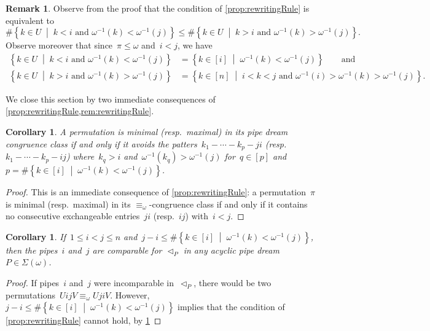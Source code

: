 \documentclass{amsart}
\newtheorem{corollary}[theorem]{Corollary}
\theoremstyle{definition}
\newtheorem{remark}[theorem]{Remark}
\newcommand{\set}[2]{\left\{ #1 \;\middle|\; #2 \right\}} %
\newcommand{\acyclicPipeDreams}{\Sigma} %
\newcommand{\less}{\vartriangleleft} %
\newcommand{\contactLess}[1]{\less_{#1}} %
\begin{document}
\begin{remark}
\label{rem:rewritingRule}
Observe from the proof that the condition of \cref{prop:rewritingRule} is equivalent to
\[
\# \set{k \in U}{k < i \text{ and } \omega^{-1}(k) < \omega^{-1}(j)} \le \# \set{k \in U}{k > i \text{ and } \omega^{-1}(k) > \omega^{-1}(j)}.
\]
Observe moreover that since~$\pi \le \omega$ and~$i < j$, we have
\begin{align*}
\set{k \in U}{k < i \text{ and } \omega^{-1}(k) < \omega^{-1}(j)} & = \set{k \in [i]}{\omega^{-1}(k) < \omega^{-1}(j)} \qquad \text{and}\\
\set{k \in U}{k > i \text{ and } \omega^{-1}(k) > \omega^{-1}(j)} & = \set{k \in [n]}{i < k < j \text{ and } \omega^{-1}(i) > \omega^{-1}(k) > \omega^{-1}(j)}.
\end{align*}
\end{remark}

We close this section by two immediate consequences of \cref{prop:rewritingRule,rem:rewritingRule}.

\begin{corollary}
\label{coro:patternAvoiding}
A permutation is minimal (resp.~maximal) in its pipe dream congruence class if and only if it avoids the patters~$k_1 - \cdots - k_p - ji$ (resp.~$k_1 - \cdots - k_p - ij$) where~$k_q > i$ and~$\omega^{-1}(k_q) > \omega^{-1}(j)$ for~$q \in [p]$ and~$p = \# \set{k \in [i]}{\omega^{-1}(k) < \omega^{-1}(j)}$.
\end{corollary}

\begin{proof}
This is an immediate consequence of \cref{prop:rewritingRule}: a permutation~$\pi$ is minimal (resp.~maximal) in its $\equiv_\omega$-congruence class if and only if it contains no consecutive exchangeable entries~$ji$ (resp.~$ij$) with~$i < j$.
\end{proof}

\begin{corollary}
\label{coro:canopy}
If~$1 \le i < j \le n$ and~$j-i \le \#\set{k \in [i]}{\omega^{-1}(k) < \omega^{-1}(j)}$, then the pipes~$i$ and~$j$ are comparable for $\contactLess{P}$ in any acyclic pipe dream~$P \in \acyclicPipeDreams(\omega)$.
\end{corollary}

\begin{proof}
If pipes~$i$ and~$j$ were incomparable in~$\contactLess{P}$, there would be two permutations~$UijV \equiv_\omega UjiV$.
However, $j-i \le \#\set{k \in [i]}{\omega^{-1}(k) < \omega^{-1}(j)}$ implies that the condition of \cref{prop:rewritingRule} cannot hold, by \cref{rem:rewritingRule}
\end{proof}
\end{document}
